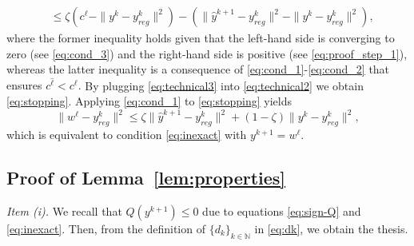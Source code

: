 \documentclass[pdflatex,sn-mathphys-num]{sn-jnl}
\numberwithin{equation}{section}%
\def\N{\mathbb{N}}
\newcommand{\yck}{{y_{reg}^k}}
\theoremstyle{thmstyleone}%
\theoremstyle{thmstyletwo}%
\theoremstyle{thmstylethree}%
\begin{document}
\begin{appendices}
\begin{align}
    &\leq \zeta(c^{\ell}-\|y^k-\yck\|^2)-\left(\|\hat{y}^{k+1}-\yck\|^2-\|y^k-\yck\|^2\right),
\end{align}
{where the former inequality holds given that the left-hand side is converging to zero (see \eqref{eq:cond_3}) and the right-hand side is positive (see \eqref{eq:proof_step_1}), whereas the latter inequality is a consequence of \eqref{eq:cond_1}-\eqref{eq:cond_2} that ensures $c^{\hat \ell}< c^{\ell}$.} {By plugging \eqref{eq:technical3} into \eqref{eq:technical2}}  we obtain \eqref{eq:stopping}. Applying \eqref{eq:cond_1} to \eqref{eq:stopping} yields
\begin{equation*}
    \|w^{{\ell}}-\yck\|^2\leq \zeta \|\hat{y}^{k+1}-\yck\|^2+(1-\zeta)\|y^k-\yck\|^2,
\end{equation*}
which is equivalent to condition \eqref{eq:inexact} with $y^{k+1}=w^{{\ell}}$.

\subsection{Proof of Lemma~\ref{lem:properties}}\label{appendix:A2}
{\it Item (i).} We recall that $Q(y^{k+1})\leq 0$ due to equations \eqref{eq:sign-Q} and \eqref{eq:inexact}. Then, from the definition of $\{d_k\}_{k\in\N}$ in \eqref{eq:dk}, we obtain the thesis.


\end{appendices}
\end{document}
